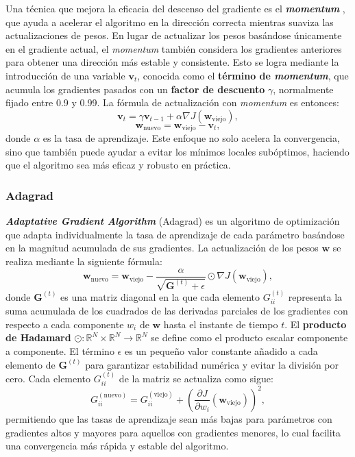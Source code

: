 Una técnica que mejora la eficacia del descenso del gradiente es el \textbf{\textit{momentum}} \cite{rumelhart1986learning}, que ayuda a acelerar el algoritmo en la dirección correcta mientras suaviza las actualizaciones de pesos. En lugar de actualizar los pesos basándose únicamente en el gradiente actual, el \textit{momentum} también considera los gradientes anteriores para obtener una dirección más estable y consistente. Esto se logra mediante la introducción de una variable \(\mathbf{v}_t\), conocida como el \textbf{término de \textit{momentum}}, que acumula los gradientes pasados con un \textbf{factor de descuento} \(\gamma\), normalmente fijado entre 0.9 y 0.99. La fórmula de actualización con \textit{momentum} es entonces:
\begin{equation}
	\mathbf{v}_{t} = \gamma \mathbf{v}_{t-1} + \alpha \nabla J(\mathbf{w}_{\text{viejo}}),
\end{equation}
\begin{equation}
	\mathbf{w}_{\text{nuevo}} = \mathbf{w}_{\text{viejo}} - \mathbf{v}_{t},
\end{equation}
donde \(\alpha\) es la tasa de aprendizaje. Este enfoque no solo acelera la convergencia, sino que también puede ayudar a evitar los mínimos locales subóptimos, haciendo que el algoritmo sea más eficaz y robusto en práctica.


\subsubsection{Adagrad}

\textbf{\textit{Adaptative Gradient Algorithm}} (Adagrad) \cite{duchi2011adaptive} es un algoritmo de optimización que adapta individualmente la tasa de aprendizaje de cada parámetro basándose en la magnitud acumulada de sus gradientes. La actualización de los pesos \(\mathbf{w}\) se realiza mediante la siguiente fórmula:
\[
\mathbf{w}_{\text{nuevo}} = \mathbf{w}_{\text{viejo}} - \frac{\alpha}{\sqrt{\mathbf{G}^{(t)} + \epsilon}} \odot \nabla J(\mathbf{w}_{\text{viejo}}),
\]
donde \( \mathbf{G}^{(t)} \) es una matriz diagonal en la que cada elemento \( G_{ii}^{(t)} \) representa la suma acumulada de los cuadrados de las derivadas parciales de los gradientes con respecto a cada componente \( w_i \) de \(\mathbf{w}\) hasta el instante de tiempo \(t\). El \textbf{producto de Hadamard} \(\odot : \mathbb{R}^N \times \mathbb{R}^N \to \mathbb{R}^N\) se define como el producto escalar componente a componente. El término \( \epsilon \) es un pequeño valor constante añadido a cada elemento de \( \mathbf{G}^{(t)} \) para garantizar estabilidad numérica y evitar la división por cero. Cada elemento \( G_{ii}^{(t)} \) de la matriz se actualiza como sigue:
\[
G_{ii}^{(\text{nuevo})} = G_{ii}^{(\text{viejo})} + \left(\frac{\partial J}{\partial w_i} (\mathbf{w}_{\text{viejo}})\right)^2,
\]
permitiendo que las tasas de aprendizaje sean más bajas para parámetros con gradientes altos y mayores para aquellos con gradientes menores, lo cual facilita una convergencia más rápida y estable del algoritmo.

